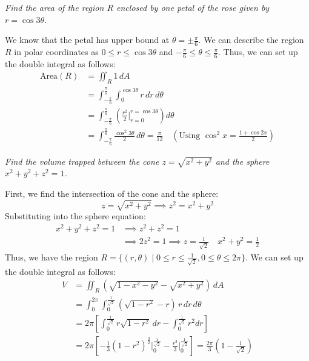 \documentclass[11pt]{report}
\begin{document}
\begin{example}
    \textit{Find the area of the region $R$ enclosed by one petal of the rose given by $r = \cos{3\theta}$.}

    We know that the petal has upper bound at $\theta = \pm \frac{\pi}{6}$. We can describe the region $R$ in polar coordinates as $0 \le r \le \cos{3\theta}$ and $-\frac{\pi}{6} \le \theta \le \frac{\pi}{6}$. Thus, we can set up the double integral as follows:
    \begin{align*}
        \text{Area}(R) &= \iint_R 1 \, dA \\
        &= \int_{-\frac{\pi}{6}}^{\frac{\pi}{6}} \int_0^{\cos{3\theta}} r \, dr \, d\theta \\
        &= \int_{-\frac{\pi}{6}}^{\frac{\pi}{6}} \left( \frac{r^2}{2} \Big|_{r=0}^{r=\cos{3\theta}} \right) d\theta \\
        &= \int_{-\frac{\pi}{6}}^{\frac{\pi}{6}} \frac{\cos^2{3\theta}}{2} \, d\theta = \frac{\pi}{12} \quad \left(\text{Using } \cos^2{x} = \frac{1 + \cos{2x}}{2}\right)
    \end{align*}
\end{example}

\begin{example}
    \textit{Find the volume trapped between the cone $z = \sqrt{x^2 + y^2}$ and the sphere $x^2 + y^2 + z^2 = 1$.}

    First, we find the intersection of the cone and the sphere:
    $$
        z = \sqrt{x^2 + y^2} \implies z^2 = x^2 + y^2
    $$
    Substituting into the sphere equation:
    \begin{align*}
        x^2 + y^2 + z^2 = 1 &\implies z^2 + z^2 = 1 \\ 
        &\implies 2z^2 = 1 \implies z = \frac{1}{\sqrt{2}} \quad x^2 + y^2 = \frac{1}{2}
    \end{align*}
    Thus, we have the region $R = \{(r, \theta) \mid 0 \le r \le \frac{1}{\sqrt{2}}, 0 \le \theta \le 2\pi\}$. We can set up the double integral as follows:
    \begin{align*}
        V &= \iint_R (\sqrt{1 - x^2 - y^2} - \sqrt{x^2 + y^2} ) \, dA \\ %
        &= \int_0^{2\pi} \int_0^{\frac{1}{\sqrt{2}}} (\sqrt{1 - r^2} - r) \, r \, dr \, d\theta \\
        &= 2\pi \left[ \int_0^{\frac{1}{\sqrt{2}}} r\sqrt{1 - r^2} \, dr - \int_0^{\frac{1}{\sqrt{2}}} r^2 dr \right] \\
        &= 2\pi \left[ -\frac{1}{3} (1 - r^2)^{\frac{3}{2}} \Big|_0^{\frac{1}{\sqrt{2}}} - \frac{r^3}{3} \Big|_0^{\frac{1}{\sqrt{2}}} \right] = \frac{2\pi}{3} (1- \frac{1}{\sqrt{2}})
    \end{align*}
\end{example}
\end{document}
